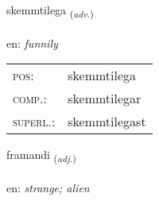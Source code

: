 \documentclass[frontgrid, backgrid]{flacards}\usepackage[]{graphicx}\usepackage[]{xcolor}
\begin{document}
\renewcommand{\flhead}{\vskip5pt \fboxsep=0pt {\small\bfseries\footnotesize Atviksorð | Adverb}}
\renewcommand{\fcfoot}{\vskip5pt \fboxsep=0pt \hspace{2pt}{\small\bfseries\footnotesize 3K}}

\renewcommand{\blhead}{\vskip5pt {\small\bfseries\footnotesize Atviksorð | Adverb }}
\renewcommand{\bcfoot}{\vskip5pt \hspace{2pt}{\small\bfseries\footnotesize 3K}}


{skemmtilega \small{\textsubscript{(\textit{adv.})}} \\[1ex] %
\textphonetic{[scɛmtɪlɛɣa]} \\
en: \emph{funnily} \\  [2ex]
\renewcommand*{\arraystretch}{0.8}
\begin{tabular}{ll}
\textsc{pos}: & skemmtilega \\ 
\textsc{comp.}: & skemmtilegar \\ 
\textsc{superl.}: & skemmtilegast \\
\end{tabular}
}

\renewcommand{\flhead}{\vskip5pt \fboxsep=0pt {\small\bfseries\footnotesize Lýsingarorð | Adjective}}
\renewcommand{\fcfoot}{\vskip5pt \fboxsep=0pt \hspace{2pt}{\small\bfseries\footnotesize 3K}}

\renewcommand{\blhead}{\vskip5pt {\small\bfseries\footnotesize Lýsingarorð | Adjective }}
\renewcommand{\bcfoot}{\vskip5pt \hspace{2pt}{\small\bfseries\footnotesize 3K}}


{framandi \small{\textsubscript{(\textit{adj.})}} \\[1ex] %
\textphonetic{[fraːmantɪ]} \\
en: \emph{strange; alien} \\  [2ex]
\renewcommand*{\arraystretch}{0.8}
}
\end{document}
